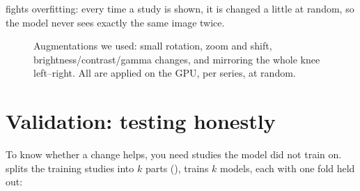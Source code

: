  fights overfitting: every time a study is shown, it is changed a little at random, so the
model never sees exactly the same image twice.

\begin{figure}[H]
\centering
{}
\caption{Augmentations we used: small rotation, zoom and shift, brightness/contrast/gamma changes, and mirroring
the whole knee left--right. All are applied on the GPU, per series, at random.}
\label{fig:augment}
\end{figure}

\section{Validation: testing honestly}

To know whether a change helps, you need studies the model did not train on. 
splits the training studies into $k$ parts (), trains $k$ models, each with one fold held out:

